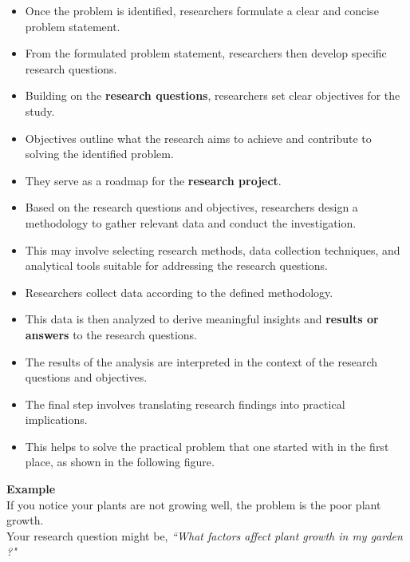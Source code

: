 \documentclass{article}
\begin{document}
	\begin{itemize}
		\item Once the problem is identified, researchers formulate a clear and concise problem statement.
		\item From the formulated problem statement, researchers then develop specific research questions.
		\item Building on the \textbf{research questions}, researchers set clear objectives for the study.
		\item Objectives outline what the research aims to achieve and contribute to solving the identified
			problem.
		\item They serve as a roadmap for the \textbf{research project}.
	
		\item Based on the research questions and objectives, researchers design a methodology to gather
			relevant data and conduct the investigation.
		\item This may involve selecting research methods, data collection techniques, and analytical tools
			suitable for addressing the research questions.
		\item Researchers collect data according to the defined methodology.
	
		\item This data is then analyzed to derive meaningful insights and \textbf{results or answers} to the
			research questions.
		\item The results of the analysis are interpreted in the context of the research questions and
			objectives.
		\item The final step involves translating research findings into practical implications.
		\item This helps to solve the practical problem that one started with in the first place, as shown in
			the following figure.
	\end{itemize}

	\noindent \textbf{Example} \\
	If you notice your plants are not growing well, the problem is the poor plant growth. \\
	Your research question might be, \emph{``What factors affect plant growth in my garden ?"} \newpage
\end{document}
